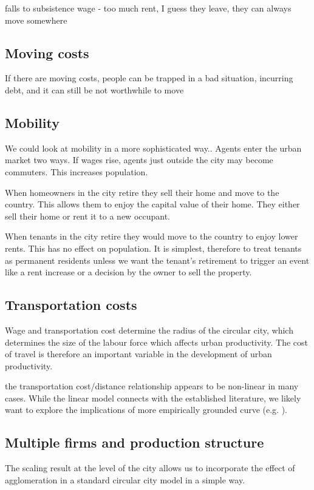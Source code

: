  falls to subsistence wage -
 too much rent, I guess they leave, they can always move somewhere

\subsection{Moving costs}
     If there are moving costs, people can be trapped in a bad situation, incurring debt, and it can still be not worthwhile to move

\subsection{Mobility}
We could look at mobility in a more sophisticated way..
Agents enter the urban market two ways. If wages rise, agents just outside the city may become commuters. This increases population. 

When homeowners in the city retire they sell their home and move to the country. This allows them  to enjoy the capital value of their home.  They either sell their home or rent it to a new occupant. 

When  tenants in the city retire they would move to the country to enjoy lower rents. This has no effect on population. It is simplest, therefore to treat tenants as permanent residents unless we want the tenant's retirement to trigger an event like a rent increase or a decision by the owner to sell the property.

\subsection{Transportation costs}
Wage and transportation cost determine the radius of the circular city, which determines the size of the labour force which affects urban productivity. The cost of travel is therefore an important variable in the development of urban productivity. 

the transportation cost/distance relationship appears to be non-linear in many cases. While the linear model connects with the established literature, we likely want to explore the implications of more empirically grounded curve (e.g. \cite{bertaudSpatialDistributionPopulation2003}).

\subsection{Multiple firms and production structure}
The scaling result at the level of the city allows us to incorporate the effect of agglomeration in a standard \gls{circular city} model in a simple way. 

